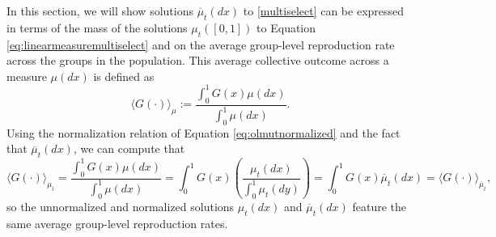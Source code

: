 \documentclass[11pt]{article}
\numberwithin{equation}{section}
\newcommand{\ol}{\overline}
\begin{document}
{In this section, we will show solutions $\ol{\mu}_t(dx)$ to \eqref{multiselect} can be expressed in terms of the mass of the solutions $\mu_t([0,1])$ to Equation \eqref{eq:linearmeasuremultiselect} and on the average group-level reproduction rate across the groups in the population. This average collective outcome across a measure $\mu(dx)$ is defined as
\begin{equation} \label{eq:Gmutavg}
    \langle G(\cdot) \rangle_{\mu} := \frac{ \int_0^1 G(x) \mu(dx)}{\int_0^1 \mu(dx)}.
\end{equation}
Using the normalization relation of Equation \eqref{eq:olmutnormalized} and the fact that $\ol{\mu}_t(dx)$, we can compute that
\begin{equation} \label{eq:Gavgequiv}
    \langle G(\cdot) \rangle_{\mu_t} = \frac{ \int_0^1 G(x) \mu(dx)}{\int_0^1 \mu(dx)} = \int_0^1 G(x) \left( \frac{\mu_t(dx)}{\int_0^1 \mu_t(dy)} \right) = \int_0^1 G(x) \ol{\mu}_t(dx) = \langle G(\cdot)\rangle_{\ol{\mu}_t},
\end{equation}
so the unnormalized and normalized solutions $\mu_t(dx)$ and $\ol{\mu}_t(dx)$ feature the same average group-level reproduction rates. 

}
\end{document}
